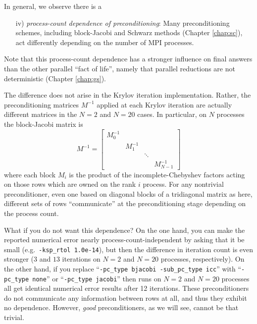 In general, we observe there is a

\begin{enumerate}
\item[iv)] \emph{process-count dependence of preconditioning}:  Many preconditioning schemes, including block-Jacobi and Schwarz methods (Chapter \ref{chap:sc}), act differently depending on the number of MPI processes.
\end{enumerate}

\noindent Note that this process-count dependence has a stronger influence on final answers than the other parallel ``fact of life'', namely that parallel reductions are not deterministic (Chapter \ref{chap:gs}).

The difference does not arise in the Krylov iteration implementation.  Rather, the preconditioning matrices $M^{-1}$ applied at each Krylov iteration are actually different matrices in the $N=2$ and $N=20$ cases.  In particular, on $N$ processes the block-Jacobi matrix is
\begin{equation}
  M^{-1} = \begin{bmatrix}
           M_0^{-1} & & & \\
           & M_1^{-1} & & \\
           & & \ddots & \\
           & & & M_{N-1}^{-1}
           \end{bmatrix}   \label{eq:ls:parallelpreconditioner}
\end{equation}
where each block $M_i$ is the product of the incomplete-Chebyshev factors acting on those rows which are owned on the rank $i$ process.  For any nontrivial preconditioner, even one based on diagonal blocks of a tridiagonal matrix as here, different sets of rows ``communicate'' at the preconditioning stage depending on the process count.

What if you do not want this dependence?  On the one hand, you can make the reported numerical error nearly process-count-independent by asking that it be small (e.g.~\texttt{-ksp\_rtol 1.0e-14}), but then the difference in iteration count is even stronger ($3$ and $13$ iterations on $N=2$ and $N=20$ processes, respectively).  On the other hand, if you replace ``\texttt{-pc\_type bjacobi -sub\_pc\_type icc}'' with ``\texttt{-pc\_type none}'' or ``\texttt{-pc\_type jacobi}'' then runs on $N=2$ and $N=20$ processes all get identical numerical error results after 12 iterations.  These preconditioners do not communicate any information between rows at all, and thus they exhibit no dependence.  However, \emph{good} preconditioners, as we will see, cannot be that trivial.

